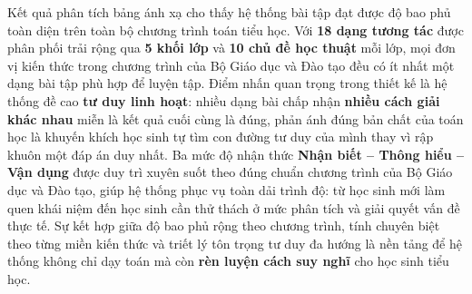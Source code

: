Kết quả phân tích bảng ánh xạ cho thấy hệ thống bài tập đạt được độ bao phủ toàn diện trên toàn bộ chương trình toán tiểu học. Với \textbf{18 dạng tương tác} được phân phối trải rộng qua \textbf{5 khối lớp} và \textbf{10 chủ đề học thuật} mỗi lớp, mọi đơn vị kiến thức trong chương trình của Bộ Giáo dục và Đào tạo đều có ít nhất một dạng bài tập phù hợp để luyện tập.
Điểm nhấn quan trọng trong thiết kế là hệ thống đề cao \textbf{tư duy linh hoạt}: nhiều dạng bài chấp nhận \textbf{nhiều cách giải khác nhau} miễn là kết quả cuối cùng là đúng, phản ánh đúng bản chất của toán học là khuyến khích học sinh tự tìm con đường tư duy của mình thay vì rập khuôn một đáp án duy nhất.
Ba mức độ nhận thức \textbf{Nhận biết -- Thông hiểu -- Vận dụng} được duy trì xuyên suốt theo đúng chuẩn chương trình của Bộ Giáo dục và Đào tạo, giúp hệ thống phục vụ toàn dải trình độ: từ học sinh mới làm quen khái niệm đến học sinh cần thử thách ở mức phân tích và giải quyết vấn đề thực tế. Sự kết hợp giữa độ bao phủ rộng theo chương trình, tính chuyên biệt theo từng miền kiến thức và triết lý tôn trọng tư duy đa hướng là nền tảng để hệ thống không chỉ dạy toán mà còn \textbf{rèn luyện cách suy nghĩ} cho học sinh tiểu học.